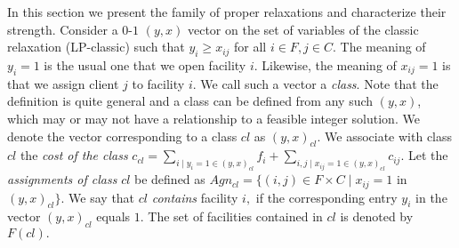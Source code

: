 \documentclass[11pt]{article}
\newtheorem{definition}{Definition}[section]
\newcommand{\lbfl}{{\sc Lbfl}}
\begin{document}
In this section  we present the family of  proper relaxations
and characterize their strength.
Consider a   $0$-$1$ $(y,x)$ vector on the set of
 variables  of the  classic  relaxation (LP-classic)
such that $y_i \geq x_{ij}$ for all $i \in F, j \in C.$  The meaning  of
 $y_i=1$ is the usual one that
 we open facility $i.$  Likewise, the meaning of $x_{ij}=1$ is
 that we assign client $j$ to facility $i$. We call such a vector a 
 \emph{class}. Note that  the definition is quite general  and a class
 can be defined  from any such $(y,x)$, which may or  may not have a
 relationship  to a  feasible  integer solution.  
We  denote the  vector
 corresponding  to a  class $cl$  as $(y,x)_{cl}$.  We  associate with
 class  $cl$   the  {\em cost   of  the  class}   $c_{cl}=\sum_{i \mid
   y_i=1  \in
   (y,x)_{cl}} f_i+  \sum_{i,j \mid  x_{ij}=1 \in  (y,x)_{cl}}
 c_{ij}$. Let the {\em assignments of class} $cl$ be defined as 
 $Agn_{cl}= \{(i,j) \in F\times C \mid  x_{ij}=1$ in $(y,x)_{cl}\}$.
We say that $cl$ {\em contains}  facility $i,$ if the corresponding entry
$y_i$  in the vector $(y,x)_{cl}$ equals $1.$  
The set of facilities contained in $cl$ is denoted by 
 $F(cl).$ 


\iffalse ------------

\begin{definition}  {\bf (Constellation LPs)} \label{def:constell}
Let $\mathcal{C}$ be a set of classes defined for an instance $I(F,C)$
of
\lbfl. Let $x_{cl}$  be a variable associated with class $cl \in
\mathcal{C}.$
The {\em  constellation LP with class set}
  $\mathcal{C}$ is defined as 

\begin{align*} 
\min \sum_{cl \in \mathcal{C}} c_{cl}x_{cl} &&  \tag{LP($\mathcal{C}$)} \\
\sum\nolimits_{{cl} \mid  \exists i:(i,j) \in  Assignments_{cl}}
x_{cl}=1 && \forall j \in C   \\
\sum\nolimits_{{cl} \mid  i  \in  F({cl})} x_{cl} \leq 1 &&
\forall i \in F  \\
 x_{cl} \geq 0  && \forall cl \in \mathcal{C} 
\end{align*} 

\end{definition}
We will refer simply to a constellation LP when
$\mathcal{C}$ is implied from the context.  
------------------ \fi 
\end{document}
